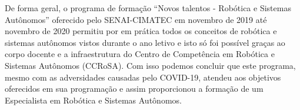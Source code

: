 De forma geral, o programa de formação ``Novos talentos - Robótica e Sistemas Autônomos'' oferecido pelo SENAI-CIMATEC em novembro de 2019 até novembro de 2020 permitiu por em prática todos os conceitos de robótica e sistemas autônomos vistos durante o ano letivo e isto só foi possível graças ao corpo docente e a infraestrutura do Centro de Competência em Robótica e Sistemas Autônomos (CCRoSA). Com isso podemos concluir que este programa, mesmo com as adversidades causadas pelo COVID-19, atendeu aos objetivos oferecidos em sua programação e assim proporcionou a formação de um Especialista em Robótica e Sistemas Autônomos. 




